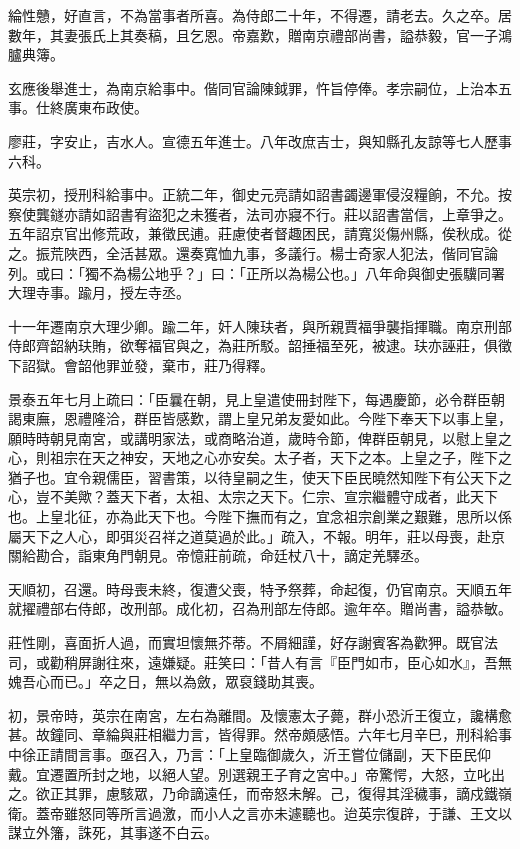\begin{pinyinscope}
綸性戇，好直言，不為當事者所喜。為侍郎二十年，不得遷，請老去。久之卒。居數年，其妻張氏上其奏稿，且乞恩。帝嘉歎，贈南京禮部尚書，謚恭毅，官一子鴻臚典簿。

玄應後舉進士，為南京給事中。偕同官論陳鉞罪，忤旨停俸。孝宗嗣位，上治本五事。仕終廣東布政使。

廖莊，字安止，吉水人。宣德五年進士。八年改庶吉士，與知縣孔友諒等七人歷事六科。

英宗初，授刑科給事中。正統二年，御史元亮請如詔書蠲邊軍侵沒糧餉，不允。按察使龔鐩亦請如詔書宥盜犯之未獲者，法司亦寢不行。莊以詔書當信，上章爭之。五年詔京官出修荒政，兼徵民逋。莊慮使者督趣困民，請寬災傷州縣，俟秋成。從之。振荒陜西，全活甚眾。還奏寬恤九事，多議行。楊士奇家人犯法，偕同官論列。或曰：「獨不為楊公地乎？」曰：「正所以為楊公也。」八年命與御史張驥同署大理寺事。踰月，授左寺丞。

十一年遷南京大理少卿。踰二年，奸人陳玞者，與所親賈福爭襲指揮職。南京刑部侍郎齊韶納玞賄，欲奪福官與之，為莊所駁。韶捶福至死，被逮。玞亦誣莊，俱徵下詔獄。會韶他罪並發，棄市，莊乃得釋。

景泰五年七月上疏曰：「臣曩在朝，見上皇遣使冊封陛下，每遇慶節，必令群臣朝謁東廡，恩禮隆洽，群臣皆感歎，謂上皇兄弟友愛如此。今陛下奉天下以事上皇，願時時朝見南宮，或講明家法，或商略治道，歲時令節，俾群臣朝見，以慰上皇之心，則祖宗在天之神安，天地之心亦安矣。太子者，天下之本。上皇之子，陛下之猶子也。宜令親儒臣，習書策，以待皇嗣之生，使天下臣民曉然知陛下有公天下之心，豈不美歟？蓋天下者，太祖、太宗之天下。仁宗、宣宗繼體守成者，此天下也。上皇北征，亦為此天下也。今陛下撫而有之，宜念祖宗創業之艱難，思所以係屬天下之人心，即弭災召祥之道莫過於此。」疏入，不報。明年，莊以母喪，赴京關給勘合，詣東角門朝見。帝憶莊前疏，命廷杖八十，謫定羌驛丞。

天順初，召還。時母喪未終，復遭父喪，特予祭葬，命起復，仍官南京。天順五年就擢禮部右侍郎，改刑部。成化初，召為刑部左侍郎。逾年卒。贈尚書，謚恭敏。

莊性剛，喜面折人過，而實坦懷無芥蒂。不屑細謹，好存謝賓客為歡狎。既官法司，或勸稍屏謝往來，遠嫌疑。莊笑曰：「昔人有言『臣門如市，臣心如水』，吾無媿吾心而已。」卒之日，無以為斂，眾裒錢助其喪。

初，景帝時，英宗在南宮，左右為離間。及懷憲太子薨，群小恐沂王復立，讒構愈甚。故鐘同、章綸與莊相繼力言，皆得罪。然帝頗感悟。六年七月辛巳，刑科給事中徐正請間言事。亟召入，乃言：「上皇臨御歲久，沂王嘗位儲副，天下臣民仰戴。宜遷置所封之地，以絕人望。別選親王子育之宮中。」帝驚愕，大怒，立叱出之。欲正其罪，慮駭眾，乃命謫遠任，而帝怒未解。己，復得其淫穢事，謫戍鐵嶺衛。蓋帝雖怒同等所言過激，而小人之言亦未遽聽也。迨英宗復辟，于謙、王文以謀立外籓，誅死，其事遂不白云。


\end{pinyinscope}
